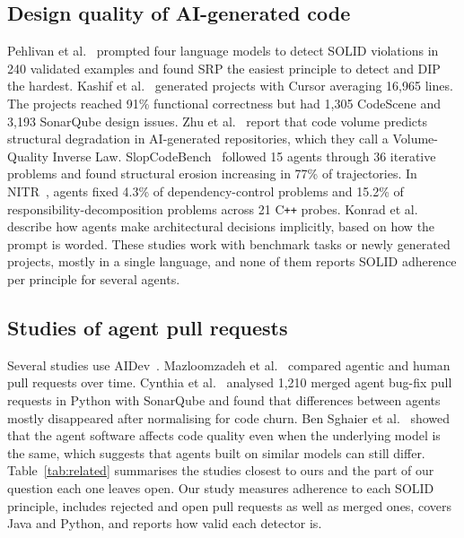 \documentclass[sigconf]{acmart}
\begin{document}
\subsection{Design quality of AI-generated code}

Pehlivan et al.~\cite{pehlivan2025solid} prompted four language models to detect SOLID violations in
240 validated examples and found SRP the easiest principle to detect and DIP the hardest. Kashif et
al.~\cite{beyond2026designissues} generated projects with Cursor averaging 16,965 lines. The
projects reached 91\% functional correctness but had 1,305 CodeScene and 3,193 SonarQube design
issues. Zhu et al.~\cite{zhu2026smells} report that code volume predicts structural degradation in
AI-generated repositories, which they call a Volume-Quality Inverse Law. SlopCodeBench~\cite{slopcodebench2026}
followed 15 agents through 36 iterative problems and found structural erosion increasing in 77\% of
trajectories. In NITR~\cite{zhu2026nitr}, agents fixed 4.3\% of dependency-control problems and
15.2\% of responsibility-decomposition problems across 21 C\texttt{++} probes. Konrad et
al.~\cite{konrad2026vibe} describe how agents make architectural decisions implicitly, based on how
the prompt is worded. These studies work with benchmark tasks or newly generated projects, mostly in a
single language, and none of them reports SOLID adherence per principle for several agents.

\subsection{Studies of agent pull requests}

Several studies use AIDev~\cite{li2025aidev}. Mazloomzadeh et al.~\cite{mazloomzadeh2026agentic}
compared agentic and human pull requests over time. Cynthia et al.~\cite{cynthia2026postmerge}
analysed 1,210 merged agent bug-fix pull requests in Python with SonarQube and found that
differences between agents mostly disappeared after normalising for code churn. Ben Sghaier et
al.~\cite{bensghaier2026harness} showed that the agent software affects code quality even when the
underlying model is the same, which suggests that agents built on similar models can still differ.
Table~\ref{tab:related} summarises the studies closest to ours and the part of our question each
one leaves open. Our study measures adherence to each SOLID principle, includes rejected and open
pull requests as well as merged ones, covers Java and Python, and reports how valid each detector
is.
\end{document}
